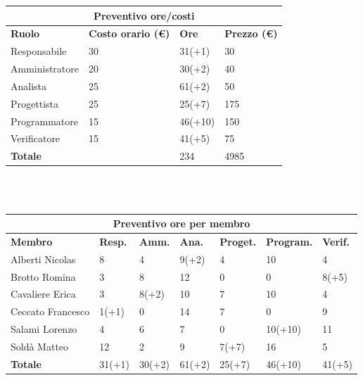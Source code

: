 \documentclass[a4paper, 12pt]{article}
\begin{document}
\begin{center}
	\begin{tabularx}{\textwidth}{|X|X|X|X|}
		\hline
		\multicolumn{4}{|c|}{\textbf{Preventivo ore/costi}}                                      \\
		\hline
		\hline
		\textbf{Ruolo}  & \textbf{Costo orario (\euro)} & \textbf{Ore} & \textbf{Prezzo (\euro)} \\
		\hline
		Responsabile    & 30                            & 31(+1)       & 30                      \\
		\hline
		Amministratore  & 20                            & 30(+2)       & 40                      \\
		\hline
		Analista        & 25                            & 61(+2)       & 50                       \\
		\hline
		Progettista     & 25                            & 25(+7)       & 175                      \\
		\hline
		Programmatore   & 15                            & 46(+10)       & 150                      \\
		\hline
		Verificatore    & 15                            & 41(+5)       & 75                      \\
		\hline
		\hline
		\textbf{Totale} &                               & 234          & 4985                    \\
		\hline
	\end{tabularx}\\[8pt]
	\mbox{}\\
\end{center}

\begin{center}
	\begin{tabularx}{\textwidth}{|X|X|X|X|X|X|X|}
		\hline
		\multicolumn{7}{|c|}{\textbf{Preventivo ore per membro}}                                      \\
		\hline
		\hline
		\textbf{Membro}  & \textbf{Resp.} & \textbf{Amm.} & \textbf{Ana.} &
		\textbf{Proget.} & \textbf{Program.} & \textbf{Verif.} \\
		\hline
		Alberti Nicolas    	&8 	&4	&9(+2)	&4	&10 &4	\\
		\hline
		Brotto Romina    	&3 	&8	&12	&0	&0	&8(+5)	\\
		\hline
		Cavaliere Erica    	&3 	&8(+2)  &10  &7 &10 &4	\\
		\hline
		Ceccato Francesco   &1(+1) 	&0  &14 &7 &0 &9	\\
		\hline
		Salami Lorenzo    	&4 	&6  &7 &0 &10(+10) &11	\\
		\hline
		Soldà Matteo    	&12	&2  &9 &7(+7) &16 &5	\\
		\hline
		\hline
		\textbf{Totale} 	&31(+1) &30(+2) &61(+2) &25(+7) &46(+10) &41(+5)	\\
		\hline
	\end{tabularx}\\[8pt]
	\mbox{}\\
\end{center}
\end{document}
